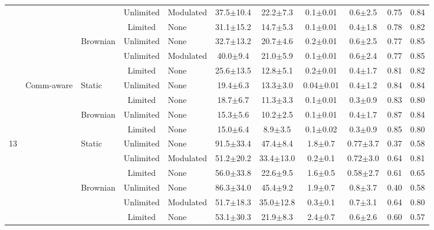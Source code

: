 \documentclass[conference]{IEEEtran}
\begin{document}
\begin{table}[ht]
\begin{tabularx}{\textwidth}{X|X|X|c|X|c|c|c|c|c|c}
  &   &          & Unlimited & Modulated & 37.5$\pm$10.4 & 22.2$\pm$7.3 & 0.1$\pm$0.01 & 0.6$\pm$2.5 & 0.75 & 0.84 \\
  &   &          & Limited   & None      & 31.1$\pm$15.2 & 14.7$\pm$5.3 & 0.1$\pm$0.01 & 0.4$\pm$1.8 & 0.78 & 0.82 \\
  \cmidrule{3-11}
  &   & \multirow{2}{*}{Brownian}
                 & Unlimited & None      & 32.7$\pm$13.2 & 20.7$\pm$4.6 & 0.2$\pm$0.01 & 0.6$\pm$2.5 & 0.77 & 0.85 \\
  &   &          & Unlimited & Modulated & 40.0$\pm$9.4  & 21.0$\pm$5.9 & 0.1$\pm$0.01 & 0.6$\pm$2.4 & 0.77 & 0.85 \\
  &   &          & Limited   & None      & 25.6$\pm$13.5 & 12.8$\pm$5.1 & 0.2$\pm$0.01 & 0.4$\pm$1.7 & 0.81 & 0.82 \\
  \cmidrule{2-11}
  & \multirow{5}{*}{Comm-aware}
    & \multirow{2}{*}{Static}
                 & Unlimited & None      & 19.4$\pm$6.3 & 13.3$\pm$3.0 & 0.04$\pm$0.01 & 0.4$\pm$1.2 & 0.84 & 0.84 \\
  &   &          & Limited   & None      & 18.7$\pm$6.7 & 11.3$\pm$3.3 & 0.1$\pm$0.01 & 0.3$\pm$0.9 & 0.83 & 0.80 \\
  \cmidrule{3-11}
  &   & \multirow{2}{*}{Brownian}
                 & Unlimited & None      & 15.3$\pm$5.6 & 10.2$\pm$2.5 & 0.1$\pm$0.01 & 0.4$\pm$1.7 & 0.87 & 0.84 \\
  &   &          & Limited   & None      & 15.0$\pm$6.4 & 8.9$\pm$3.5 & 0.1$\pm$0.02 & 0.3$\pm$0.9 & 0.85 & 0.80 \\
\midrule
\multirow{10}{*}{13}
  & \multirow{5}{*}{Stochastic}
    & \multirow{2}{*}{Static}
                 & Unlimited & None      & 91.5$\pm$33.4 & 47.4$\pm$8.4 & 1.8$\pm$0.7 & 0.77$\pm$3.7 & 0.37 & 0.58 \\
  &   &          & Unlimited & Modulated & 51.2$\pm$20.2 & 33.4$\pm$13.0 & 0.2$\pm$0.1 & 0.72$\pm$3.0 & 0.64 & 0.81 \\
  &   &          & Limited   & None      & 56.0$\pm$33.8 & 22.6$\pm$9.5 & 1.6$\pm$0.5 & 0.58$\pm$2.7 & 0.61 & 0.65 \\
  \cmidrule{3-11}
  &   & \multirow{2}{*}{Brownian}
                 & Unlimited & None      & 86.3$\pm$34.0 & 45.4$\pm$9.2 & 1.9$\pm$0.7 & 0.8$\pm$3.7 & 0.40 & 0.58 \\
  &   &          & Unlimited & Modulated & 51.7$\pm$18.3 & 35.0$\pm$12.8 & 0.3$\pm$0.1 & 0.7$\pm$3.1 & 0.64 & 0.80 \\
  &   &          & Limited   & None      & 53.1$\pm$30.3 & 21.9$\pm$8.3 & 2.4$\pm$0.7 & 0.6$\pm$2.6 & 0.60 & 0.57 \\

\end{tabularx}
\end{table}
\end{document}
